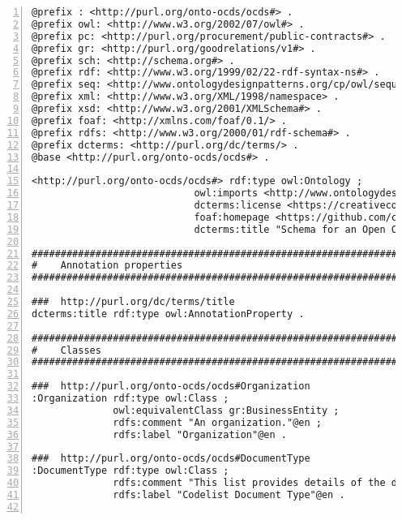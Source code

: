 \noindent\begin{minipage}{\textwidth}
 \begin{lstlisting}[captionpos=b, caption={Extracto de código de la ontología OCDSPY}, label={lst:ocdspyAnexo},  numbers=left,  numberstyle=\tiny\color{mygray},frame=single]
@prefix : <http://purl.org/onto-ocds/ocds#> .
@prefix owl: <http://www.w3.org/2002/07/owl#> .
@prefix pc: <http://purl.org/procurement/public-contracts#> .
@prefix gr: <http://purl.org/goodrelations/v1#> .
@prefix sch: <http://schema.org#> .
@prefix rdf: <http://www.w3.org/1999/02/22-rdf-syntax-ns#> .
@prefix seq: <http://www.ontologydesignpatterns.org/cp/owl/sequence.owl#> .
@prefix xml: <http://www.w3.org/XML/1998/namespace> .
@prefix xsd: <http://www.w3.org/2001/XMLSchema#> .
@prefix foaf: <http://xmlns.com/foaf/0.1/> .
@prefix rdfs: <http://www.w3.org/2000/01/rdf-schema#> .
@prefix dcterms: <http://purl.org/dc/terms/> .
@base <http://purl.org/onto-ocds/ocds#> .

<http://purl.org/onto-ocds/ocds#> rdf:type owl:Ontology ;
                            owl:imports <http://www.ontologydesignpatterns.org/cp/owl/sequence.owl> ;
                            dcterms:license <https://creativecommons.org/licenses/by/2.0/> ;
                            foaf:homepage <https://github.com/camilobaezcamba/open-contracting-ld> ;
                            dcterms:title "Schema for an Open Contracting Release"@en .

#################################################################
#    Annotation properties
#################################################################

###  http://purl.org/dc/terms/title
dcterms:title rdf:type owl:AnnotationProperty .

#################################################################
#    Classes
#################################################################

###  http://purl.org/onto-ocds/ocds#Organization
:Organization rdf:type owl:Class ;
              owl:equivalentClass gr:BusinessEntity ;
              rdfs:comment "An organization."@en ;
              rdfs:label "Organization"@en .

###  http://purl.org/onto-ocds/ocds#DocumentType
:DocumentType rdf:type owl:Class ;
              rdfs:comment "This list provides details of the documents that publishers may wish to provide at various points their contracting process."@en ;
              rdfs:label "Codelist Document Type"@en .


\end{lstlisting}
\end{minipage}
